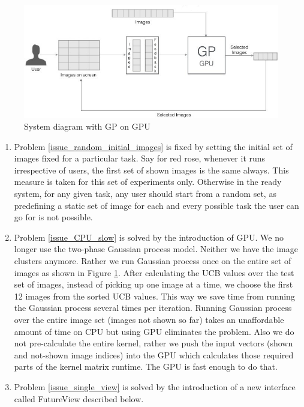 \documentclass[english]{tktltiki}
\begin{document}
\begin{figure}[h!]
  \centering
    \includegraphics[width=1.0\textwidth]{figures/Imse_System_Diagram_2}
    \caption{System diagram with GP on GPU}
    \label{system_diagram_2}
\end{figure}

\begin{enumerate}
	\item Problem \ref{issue_random_initial_images} is fixed by setting the initial set of images fixed for a particular task. Say for red rose, whenever it runs irrespective of users, the first set of shown images is the same always. This measure is taken for this set of experiments only. Otherwise in the ready system, for any given task, any user should start from a random set, as predefining a static set of image for each and every possible task the user can go for is not possible.
	\item Problem \ref{issue_CPU_slow} is solved by the introduction of GPU. We no longer use the two-phase Gaussian process model. Neither we have the image clusters anymore. Rather we run Gaussian process once on the entire set of images as shown in Figure \ref{system_diagram_2}. After calculating the UCB values over the test set of images, instead of picking up one image at a time, we choose the first 12 images from the sorted UCB values. This way we save time from running the Gaussian process several times per iteration. Running Gaussian process over the entire image set (images not shown so far) takes an unaffordable amount of time on CPU but using GPU eliminates the problem. Also we do not pre-calculate the entire kernel, rather we push the input vectors (shown and not-shown image indices) into the GPU which calculates those required parts of the kernel matrix runtime. The GPU is fast enough to do that.
	\item Problem \ref{issue_single_view} is solved by the introduction of a new interface called FutureView described below.
 
\end{enumerate}
\end{document}
